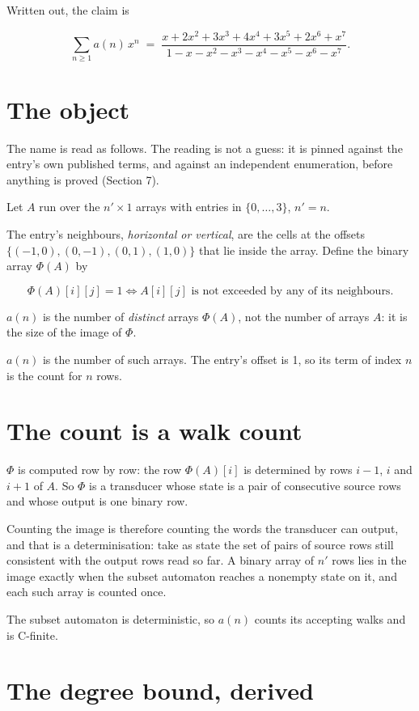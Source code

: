 \documentclass[11pt]{article}
\theoremstyle{definition}
\begin{document}
Written out, the claim is

\[\sum_{n \ge 1} a(n)\,x^n \;=\; \frac{x + 2x^{2} + 3x^{3} + 4x^{4} + 3x^{5} + 2x^{6} + x^{7}}{1 - x - x^{2} - x^{3} - x^{4} - x^{5} - x^{6} - x^{7}}.\]

\section{The object}

The name is read as follows. The reading is not a guess: it is pinned against the entry's own published terms, and against an independent enumeration, before anything is proved (Section 7).

Let $A$ run over the $n' \times 1$ arrays with entries in $\{0,\dots,3\}$, $n' = n$.

The entry's neighbours, {\itshape horizontal or vertical}, are the cells at the offsets $\{(-1,0), (0,-1), (0,1), (1,0)\}$ that lie inside the array. Define the binary array $\Phi(A)$ by

\[\Phi(A)[i][j] = 1 \iff A[i][j] \text{ is not exceeded by any of its neighbours}.\]

$a(n)$ is the number of {\itshape distinct} arrays $\Phi(A)$, not the number of arrays $A$: it is the size of the image of $\Phi$.

$a(n)$ is the number of such arrays. The entry's offset is 1, so its term of index $n$ is the count for $n$ rows.

\section{The count is a walk count}

$\Phi$ is computed row by row: the row $\Phi(A)[i]$ is determined by rows $i-1$, $i$ and $i+1$ of $A$. So $\Phi$ is a transducer whose state is a pair of consecutive source rows and whose output is one binary row.

Counting the image is therefore counting the words the transducer can output, and that is a determinisation: take as state the set of pairs of source rows still consistent with the output rows read so far. A binary array of $n'$ rows lies in the image exactly when the subset automaton reaches a nonempty state on it, and each such array is counted once.

The subset automaton is deterministic, so $a(n)$ counts its accepting walks and is C-finite.

\section{The degree bound, derived}
\end{document}
